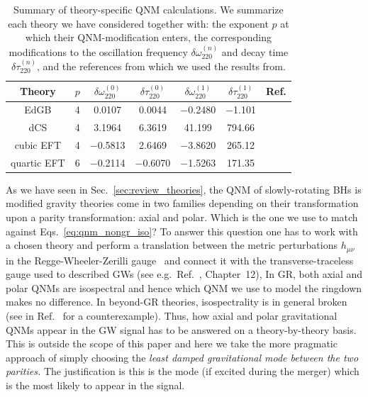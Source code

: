 \documentclass[twocolumn,
               prd,
               aps,
               superscriptaddress,
               tightenlines,
               nofootinbib,
               eqsecnum,
               amsfonts,
               amsmath,
               longbibliography]{revtex4-1}
\begin{document}
\begin{table}[t]
\begin{tabular}{c | c c c c c c}
\hline
\hline
Theory & $p$ & $\delta \omega^{(0)}_{220}$ & $\delta \tau^{(0)}_{220}$ & $\delta \omega^{(1)}_{220}$ & $\delta \tau^{(1)}_{220}$ & Ref.  \\
\hline
EdGB        & 4 & 0.0107    & 0.0044    & $-$0.2480 & $-$1.101 &  \cite{Blazquez-Salcedo:2016enn,Pierini:2021jxd} \\
dCS         & 4 & 3.1964    & 6.3619    & 41.199    & 794.66   &  \cite{Wagle:2021tam}  \\
cubic EFT   & 4 & $-$0.5813 & 2.6469    & $-$3.8620 & 265.12   & \cite{Cano:2021myl} \\
quartic EFT & 6 & $-$0.2114 & $-$0.6070 & $-$1.5263 & 171.35   & \cite{Cano:2021myl}  \\
\hline
\hline
\end{tabular}
\caption{Summary of theory-specific QNM calculations.
%
We summarize each theory we have considered together with: the exponent $p$ at
which their QNM-modification enters, the corresponding modifications to the
oscillation frequency $\delta \omega^{(n)}_{220}$ and decay time $\delta \tau^{(n)}_{220}$, and the
references from which we used the results from.
}
\label{tab:ref_theories_qnms}
\end{table}

As we have seen in Sec.~\ref{sec:review_theories}, the QNM of slowly-rotating
BHs is modified gravity theories come in two families depending on their
transformation upon a parity transformation: axial and polar. Which is the one
we use to match against Eqs.~\eqref{eq:qnm_nongr_iso}?
%
To answer this question one has to work with a chosen theory and perform a
translation between the metric perturbations $h_{\mu\nu}$ in the
Regge-Wheeler-Zerilli gauge~\cite{Regge:1957td,Zerilli:1970se} and connect it with the transverse-traceless gauge
used to described GWs (see e.g.~Ref.~\cite{Maggiore:2018sht}, Chapter~12),
%
In GR, both axial and polar QNMs are isospectral and hence which QNM we use to
model the ringdown makes no difference.
%
In beyond-GR theories, isospectrality is in general broken (see
in Ref.~\cite{Hui:2021cpm} for a counterexample).
%
Thus, how axial and polar gravitational QNMs appear in the GW signal has to be
answered on a theory-by-theory basis.
%
This is outside the scope of this paper and here we take the more pragmatic
approach of simply choosing the \emph{least damped gravitational mode between
the two parities.}
%
The justification is this is the mode (if excited during the merger) which is
the most likely to appear in the signal.
\end{document}
